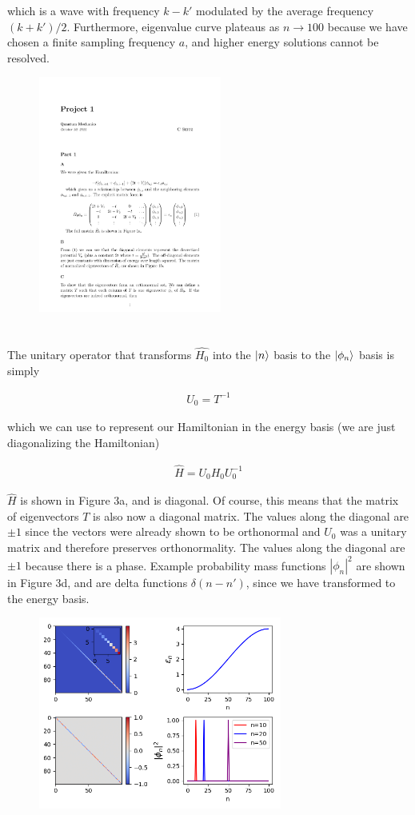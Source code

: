 \documentclass[%
 reprint,
 amsmath,amssymb,
 aps,
]{revtex4-2}
\begin{document}
which is a wave with frequency $k-k'$ modulated by the average frequency $(k+k')/2$. 
Furthermore, eigenvalue curve plateaus as $n\rightarrow 100$ because we have chosen a finite sampling frequency $a$, and higher energy solutions cannot be resolved.


\begin{figure}[t!]
\centering
\includegraphics[width=6cm]{p1_2}
\caption{}
\label{fig:method}
\end{figure}

\section{}

The unitary operator that transforms $\hat{H_{0}}$ into the $\ket{n}$ basis to the $\ket{\phi_{n}}$ basis is simply

\begin{align*}
U_{0} = T^{-1}
\end{align*}

which we can use to represent our Hamiltonian in the energy basis (we are just diagonalizing the Hamiltonian)

\begin{align*}
\hat{H} = U_{0} H_{0} U_{0}^{-1}
\end{align*}

$\hat{H}$ is shown in Figure 3a, and is diagonal. Of course, this means that the matrix of eigenvectors $T$ is also now a diagonal matrix. The values along the diagonal are $\pm 1$ since the vectors were already shown to be orthonormal and $U_{0}$ was a unitary matrix and therefore preserves orthonormality. The values along the diagonal are $\pm 1$ because there is a phase. Example probability mass functions $|\phi_{n}|^{2}$ are shown in Figure 3d, and are delta functions $\delta(n-n')$, since we have transformed to the energy basis.

\begin{figure}[t!]
\centering
\includegraphics[width=8cm]{p1_3}
\caption{}
\label{fig:method}
\end{figure}
\end{document}
